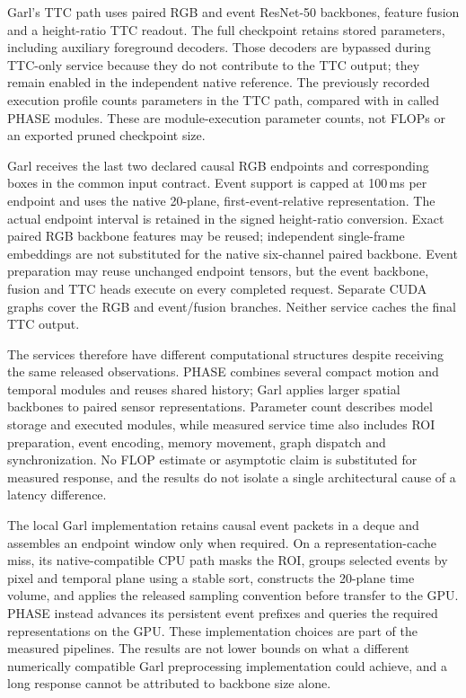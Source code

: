 Garl's TTC path uses paired RGB and event ResNet-50 backbones, feature fusion and a height-ratio TTC readout. The full checkpoint retains \LocalGarlStoredParameters{} stored parameters, including auxiliary foreground decoders. Those decoders are bypassed during TTC-only service because they do not contribute to the TTC output; they remain enabled in the independent native reference. The previously recorded execution profile counts \LocalGarlTTCParameters{} parameters in the TTC path, compared with \LocalPhaseExecutedParameters{} in called PHASE modules. These are module-execution parameter counts, not FLOPs or an exported pruned checkpoint size.

Garl receives the last two declared causal RGB endpoints and corresponding boxes in the common input contract. Event support is capped at 100\,ms per endpoint and uses the native 20-plane, first-event-relative representation. The actual endpoint interval is retained in the signed height-ratio conversion. Exact paired RGB backbone features may be reused; independent single-frame embeddings are not substituted for the native six-channel paired backbone. Event preparation may reuse unchanged endpoint tensors, but the event backbone, fusion and TTC heads execute on every completed request. Separate CUDA graphs cover the RGB and event/fusion branches. Neither service caches the final TTC output.

The services therefore have different computational structures despite receiving the same released observations. PHASE combines several compact motion and temporal modules and reuses shared history; Garl applies larger spatial backbones to paired sensor representations. Parameter count describes model storage and executed modules, while measured service time also includes ROI preparation, event encoding, memory movement, graph dispatch and synchronization. No FLOP estimate or asymptotic claim is substituted for measured response, and the results do not isolate a single architectural cause of a latency difference.

The local Garl implementation retains causal event packets in a deque and assembles an endpoint window only when required. On a representation-cache miss, its native-compatible CPU path masks the ROI, groups selected events by pixel and temporal plane using a stable sort, constructs the 20-plane time volume, and applies the released sampling convention before transfer to the GPU. PHASE instead advances its persistent event prefixes and queries the required representations on the GPU. These implementation choices are part of the measured pipelines. The results are not lower bounds on what a different numerically compatible Garl preprocessing implementation could achieve, and a long response cannot be attributed to backbone size alone.

